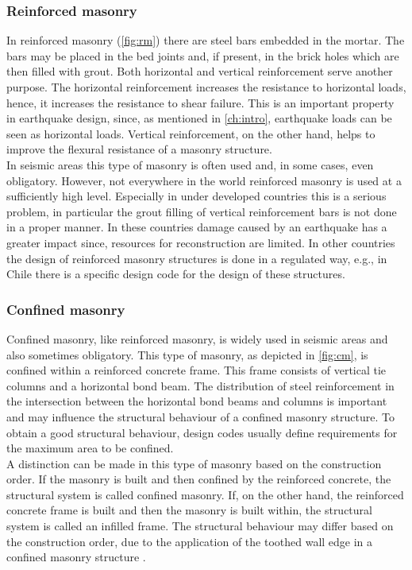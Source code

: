 \subsubsection{Reinforced masonry}
In reinforced masonry (\autoref{fig:rm}) there are steel bars embedded in the mortar. The bars may be placed in the bed joints and, if present, in the brick holes which are then filled with grout. Both horizontal and vertical reinforcement serve another purpose. The horizontal reinforcement increases the resistance to horizontal loads, hence, it increases the resistance to shear failure. This is an important property in earthquake design, since, as mentioned in \autoref{ch:intro}, earthquake loads can be seen as horizontal loads. Vertical reinforcement, on the other hand, helps to improve the flexural resistance of a masonry structure.\\

In seismic areas this type of masonry is often used and, in some cases, even obligatory. However, not everywhere in the world reinforced masonry is used at a sufficiently high level. Especially in under developed countries this is a serious problem, in particular the grout filling of vertical reinforcement bars is not done in a proper manner. In these countries damage caused by an earthquake has a greater impact since, resources for reconstruction are limited. In other countries the design of reinforced masonry structures is done in a regulated way, e.g., in Chile there is a specific design code for the design of these structures.
\subsubsection{Confined masonry}
Confined masonry, like reinforced masonry, is widely used in seismic areas and also sometimes obligatory. This type of masonry, as depicted in \autoref{fig:cm}, is confined within a reinforced concrete frame. This frame consists of vertical tie columns and a horizontal bond beam. The distribution of steel reinforcement in the intersection between the horizontal bond beams and columns is important and may influence the structural behaviour of a confined masonry structure. To obtain a good structural behaviour, design codes usually define requirements for the maximum area to be confined.\\

A distinction can be made in this type of masonry based on the construction order. If the masonry is built and then confined by the reinforced concrete, the structural system is called confined masonry. If, on the other hand, the reinforced concrete frame is built and then the masonry is built within, the structural system is called an infilled frame. The structural behaviour may differ based on the construction order, due to the application of the toothed wall edge in a confined masonry structure \cite{blondet2005construction}.

